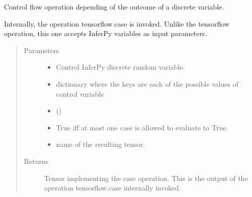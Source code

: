 \documentclass[letterpaper,10pt,english]{sphinxmanual}
\begin{document}
\begin{fulllineitems}
\label{\detokenize{modules/inferpy.util:inferpy.util.ops.case_states}}
Control flow operation depending of the outcome of a discrete variable.

Internally, the operation tensorflow.case is invoked. Unlike the tensorflow operation, this one
accepts InferPy variables as input parameters.
\begin{quote}\begin{description}
\item[{Parameters}] \leavevmode\begin{itemize}
\item {} 
 \textendash{} Control InferPy discrete random variable.

\item {} 
 \textendash{} dictionary where the keys are each of the possible values of control variable

\item {} 
 () \textendash{} 

\item {} 
 \textendash{} True iff at most one case is allowed to evaluate to True.

\item {} 
 \textendash{} name of the resulting tensor.

\end{itemize}

\item[{Returns}] \leavevmode
Tensor implementing the case operation. This is the output of the operation
tensorflow.case internally invoked.

\end{description}\end{quote}

\end{fulllineitems}

\end{document}
